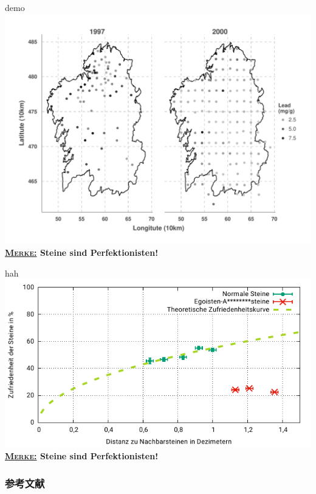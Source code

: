 \documentclass[11pt,compress,xcolor=x11names,UTF8]{ctexbeamer}
\begin{document}
\begin{frame}{demo}
\centering
\includegraphics[width=.85\textheight]{demo03} \\

\flushleft
\textbf{\underline{\textsc{Merke:}}\hspace{1em} Steine sind Perfektionisten!}
\end{frame}



\begin{frame}{hah}
\centering
\includegraphics[width=.85\textheight]{zufriedenheit} \\

\flushleft
\textbf{\underline{\textsc{Merke:}}\hspace{1em} Steine sind Perfektionisten!}
\end{frame}


\begin{frame}[allowframebreaks]
\frametitle{参考文献}


\end{frame}
\end{document}
